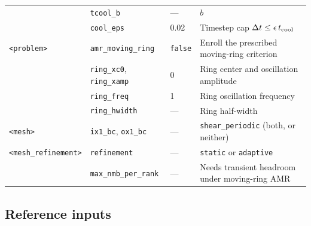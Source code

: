 \documentclass[11pt]{article}
\newcommand{\code}[1]{\texttt{#1}}
\begin{document}
\begin{center}
\begin{tabular}{@{}lllp{5.4cm}@{}}
                 & \code{tcool\_b} & --- & $b$ \\
                 & \code{cool\_eps} & 0.02 & Timestep cap
                   $\Delta t \le \epsilon\,t_{\rm cool}$ \\
\midrule
\code{<problem>} & \code{amr\_moving\_ring} & \code{false} & Enroll the prescribed
                   moving-ring criterion \\
                 & \code{ring\_xc0}, \code{ring\_xamp} & 0 & Ring center and
                   oscillation amplitude \\
                 & \code{ring\_freq} & 1 & Ring oscillation frequency \\
                 & \code{ring\_hwidth} & --- & Ring half-width \\
\midrule
\code{<mesh>} & \code{ix1\_bc}, \code{ox1\_bc} & --- & \code{shear\_periodic}
                (both, or neither) \\
\midrule
\code{<mesh\_refinement>} & \code{refinement} & --- & \code{static} or \code{adaptive} \\
                          & \code{max\_nmb\_per\_rank} & --- & Needs transient headroom
                            under moving-ring AMR \\
\bottomrule
\end{tabular}
\end{center}

\subsection{Reference inputs}
\end{document}
